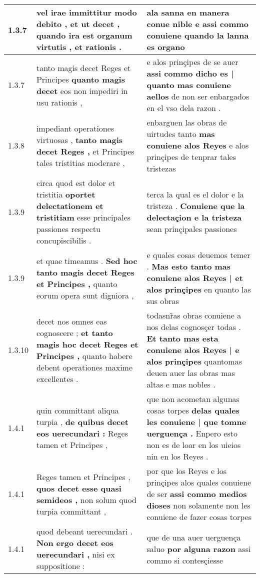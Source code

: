 \begin{tabular}{|p{1cm}|p{6.5cm}|p{6.5cm}|}
1.3.7 & vel irae immittitur modo debito , \textbf{ et ut decet , } quando ira est organum virtutis , et rationis . & ala sanna en manera conue nible \textbf{ e assi commo conuiene } quando la lanna es organo \\\hline
1.3.7 & tanto magis decet Reges et Principes \textbf{ quanto magis decet } eos non impediri in usu rationis , & e alos prinçipes de se auer \textbf{ assi commo dicho es | quanto mas conuiene aellos } de non ser enbargados en el vso dela razon . \\\hline
1.3.8 & impediant operationes virtuosas , \textbf{ tanto magis decet Reges , } et Principes tales tristitias moderare , & enbarguen las obras de uirtudes tanto \textbf{ mas conuiene alos Reyes } e alos prinçipes de tenprar tales tristezas \\\hline
1.3.9 & circa quod est dolor et tristitia \textbf{ oportet delectationem et tristitiam } esse principales passiones respectu concupiscibilis . & terca la qual es el dolor e la tristeza . \textbf{ Conuiene que la delectaçion e la tristeza } sean prinçipales passiones \\\hline
1.3.9 & et quae timeamus . \textbf{ Sed hoc tanto magis decet Reges et Principes , } quanto eorum opera sunt digniora , & e quales cosas deuemos temer . \textbf{ Mas esto tanto mas conuiene alos Reyes | et alos prinçipes } en quanto las sus obras \\\hline
1.3.10 & decet nos omnes eas cognoscere ; \textbf{ et tanto magis hoc decet Reges et Principes , } quanto habere debent operationes maxime excellentes . & todasnr̃as obras conuiene a nos delas cognosçer todas . \textbf{ Et tanto mas esta conuiene alos Reyes | e alos prinçipes } quantomas deuen auer las obras mas altas e mas nobles . \\\hline
1.4.1 & quin committant aliqua turpia , \textbf{ de quibus decet eos uerecundari : } Reges tamen et Principes , & que non acometan algunas cosas torpes \textbf{ delas quales les conuiene | que tomne uerguença . } Enpero esto non es de loar en los uieios nin en los Reyes . \\\hline
1.4.1 & Reges tamen et Principes , \textbf{ quos decet esse quasi semideos , } non solum quod turpia committant , & por que los Reyes e los prinçipes alos quales conuiene de ser \textbf{ assi commo medios dioses } non solamente non les conuiene de fazer cosas torpes \\\hline
1.4.1 & quod debeant uerecundari . \textbf{ Non ergo decet eos uerecundari , } nisi ex suppositione : & que de una auer uerguença saluo \textbf{ por alguna razon } assi commo si contesçiesse \\\hline

\end{tabular}
